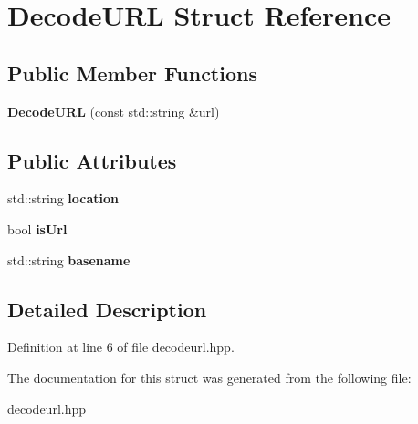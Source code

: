 \hypertarget{struct_decode_u_r_l}{\section{Decode\-U\-R\-L Struct Reference}
\label{struct_decode_u_r_l}
}
\subsection*{Public Member Functions}
\begin{DoxyCompactItemize}
\item 
\hypertarget{struct_decode_u_r_l_a500412b040290d8993798e3e3fe108db}{{\bfseries Decode\-U\-R\-L} (const std\-::string \&url)}\label{struct_decode_u_r_l_a500412b040290d8993798e3e3fe108db}

\end{DoxyCompactItemize}
\subsection*{Public Attributes}
\begin{DoxyCompactItemize}
\item 
\hypertarget{struct_decode_u_r_l_a792308fadc23cc4c8d3a70ed058517da}{std\-::string {\bfseries location}}\label{struct_decode_u_r_l_a792308fadc23cc4c8d3a70ed058517da}

\item 
\hypertarget{struct_decode_u_r_l_aa08f18d230eb1679d8f763b21f40a118}{bool {\bfseries is\-Url}}\label{struct_decode_u_r_l_aa08f18d230eb1679d8f763b21f40a118}

\item 
\hypertarget{struct_decode_u_r_l_a90eef28074e52f6b003a9295d117df1a}{std\-::string {\bfseries basename}}\label{struct_decode_u_r_l_a90eef28074e52f6b003a9295d117df1a}

\end{DoxyCompactItemize}


\subsection{Detailed Description}


Definition at line 6 of file decodeurl.\-hpp.



The documentation for this struct was generated from the following file\-:\begin{DoxyCompactItemize}
\item 
decodeurl.\-hpp\end{DoxyCompactItemize}
